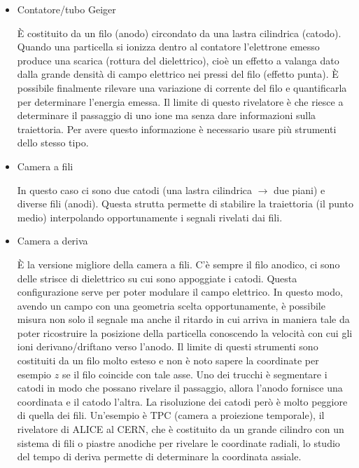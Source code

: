\documentclass[12pt]{book}
\begin{document}
\begin{itemize}
	\item Contatore/tubo Geiger
	
	È costituito da un filo (anodo) circondato da una lastra cilindrica (catodo). Quando una particella si ionizza dentro al contatore l'elettrone emesso produce una scarica (rottura del dielettrico), cioè un effetto a valanga dato dalla grande densità di campo elettrico nei pressi del filo (effetto punta). È possibile finalmente rilevare una variazione di corrente del filo e quantificarla per determinare l'energia emessa. Il limite di questo rivelatore è che riesce a determinare il passaggio di uno ione ma senza dare informazioni sulla traiettoria. Per avere questo informazione è necessario usare più strumenti dello stesso tipo.
	
	\item Camera a fili
	
	In questo caso ci sono due catodi (una lastra cilindrica $\longrightarrow$ due piani) e diverse fili (anodi). Questa strutta permette di stabilire la traiettoria (il punto medio) interpolando opportunamente i segnali rivelati dai fili.
	
	\newpage
	\item Camera a deriva
	
	È la versione migliore della camera a fili. C'è sempre il filo anodico, ci sono delle strisce di dielettrico su cui sono appoggiate i catodi. Questa configurazione serve per poter modulare il campo elettrico. In questo modo, avendo un campo con una geometria scelta opportunamente, è possibile misura non solo il segnale ma anche il ritardo in cui arriva in maniera tale da poter ricostruire la posizione della particella conoscendo la velocità con cui gli ioni derivano/driftano verso l'anodo. Il limite di questi strumenti sono costituiti da un filo molto esteso e non è noto sapere la coordinate per esempio $z$ se il filo coincide con tale asse. Uno dei trucchi è segmentare i catodi in modo che possano rivelare il passaggio, allora l'anodo fornisce una coordinata e il catodo l'altra. La risoluzione dei catodi però è molto peggiore di quella dei fili. Un'esempio è TPC (camera a proiezione temporale), il rivelatore di ALICE al CERN, che è costituito da un grande cilindro con un sistema di fili o piastre anodiche per rivelare le coordinate radiali, lo studio del tempo di deriva permette di determinare la coordinata assiale.
\end{itemize}
\end{document}

